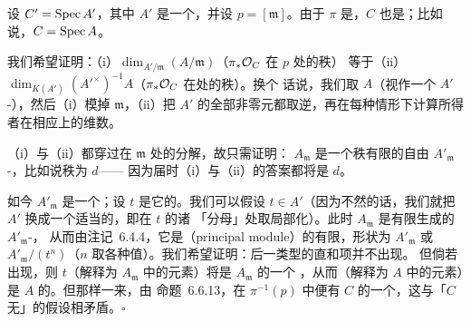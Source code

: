 设 $C'=\operatorname{Spec} A'$，其中 $A'$ 是一个\trIntegralDomain，并设 $p=[\mathfrak{m}]$。由于 $\pi$
是\trAffine\trMorphism，$C$ 也是\trAffine\trScheme；比如说，$C=\operatorname{Spec} A$。

我们希望证明：（i）$\dim_{A'/\mathfrak{m}}(A/\mathfrak{m})$（$\pi_*\mathcal{O}_C$ 在 $p$ 处的秩）
等于（ii）$\dim_{K(A')}(A'^\times)^{-1}A$（$\pi_*\mathcal{O}_C$ 在\trGenericPoint{}处的秩）。换个
话说，我们取 $A$（视作一个 $A'$-\trModule），然后（i）模掉 $\mathfrak{m}$，（ii）把 $A'$
的全部非零元都取逆，再在每种情形下计算所得者在相应\trField{}上的维数。

（i）与（ii）都穿过在 $\mathfrak{m}$ 处的\trLocalization{}分解，故只需证明：
$A_{\mathfrak{m}}$ 是一个秩有限的自由 $A'_{\mathfrak{m}}$-\trModule，比如说秩为 $d$——
因为届时（i）与（ii）的答案都将是 $d$。

如今 $A'_{\mathfrak{m}}$ 是一个\trDVR；设 $t$ 是它的\trUniformizer。我们可以假设
$t\in A'$（因为不然的话，我们就把 $A'$ 换成一个适当的\trLocalization，即在 $t$ 的诸
「分母」处取局部化）。此时 $A_{\mathfrak{m}}$ 是有限生成的 $A'_{\mathfrak{m}}$-\trModule，
从而由\mbox{注记~6.4.4}，它是\trPrincipalModule（principal module）的有限\trDirectSum，形状为 $A'_{\mathfrak{m}}$
或 $A'_{\mathfrak{m}}/(t^n)$（$n$ 取各种值）。我们希望证明：后一类型的直和项并不出现。
但倘若出现，则 $t$（解释为 $A_{\mathfrak{m}}$ 中的元素）将是 $A_{\mathfrak{m}}$ 的一个%
\trZerodivisor，从而（解释为 $A$ 中的元素）是 $A$ 的\trZerodivisor。但那样一来，由
\mbox{命题~6.6.13}，在 $\pi^{-1}(p)$ 中便有 $C$ 的一个\trAssociatedPoint，这与「$C$
无\trEmbeddedPoint」的假设相矛盾。\hfill$\square$

